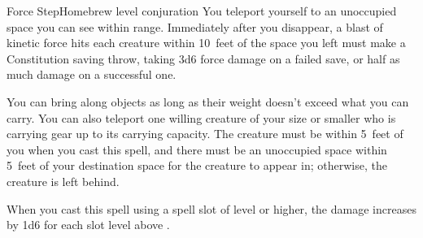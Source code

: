 \begin{spell}{Force Step}{Homebrew}{ level conjuration}
{
}
You teleport yourself to an unoccupied space you can
see within range. Immediately after you disappear, a
blast of kinetic force hits each creature within
10~feet of the space you left must make a Constitution saving
throw, taking 3d6 force damage on a failed save,
or half as much damage on a successful one.

You can bring along objects as long as their weight
doesn't exceed what you can carry. You can also teleport
one willing creature of your size or smaller who is
carrying gear up to its carrying capacity. The creature
must be within 5~feet of you when you cast this spell,
and there must be an unoccupied space within 5~feet of
your destination space for the creature to appear in; otherwise,
the creature is left behind.

 When you cast this spell using a
spell slot of  level or higher, the damage increases by
1d6 for each slot level above .
\end{spell}
